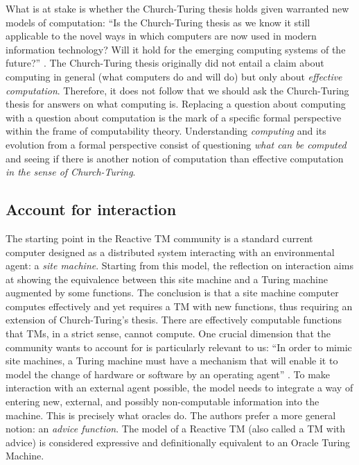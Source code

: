 \documentclass[a4paper, 11pt, twoside]{article}
\begin{document}
What is at stake is whether the Church-Turing thesis holds given warranted new models of computation: ``Is the Church-Turing thesis as we know it still applicable to the novel ways in which computers are now used in modern information technology? Will it hold for the emerging computing systems of the future?'' \parencite{VanLeeuwen2001}. 
The Church-Turing thesis originally did not entail a claim about computing in general (what computers do and will do) but only about \textit{effective computation}. Therefore, it does not follow that we should ask the Church-Turing thesis for answers on what computing is. Replacing a question about computing with a question about computation is the mark of a specific formal perspective within the frame of computability theory. Understanding \textit{computing} and its evolution from a formal perspective consist of questioning \textit{what can be computed} and seeing if there is another notion of computation than effective computation \textit{in the sense of Church-Turing}. 

\subsection{Account for interaction}

The starting point in the Reactive TM community is a standard current computer designed as a distributed system interacting with an environmental agent: a \textit{site machine}. Starting from this model, the reflection on interaction aims at showing the equivalence between this site machine and a Turing machine augmented by some functions. The conclusion is that a site machine computer computes effectively and yet requires a TM with new functions, thus requiring an extension of Church-Turing's thesis. There are effectively computable functions that TMs, in a strict sense, cannot compute. One crucial dimension that the community wants to account for is particularly relevant to us: ``In order to mimic site machines, a Turing machine must have a mechanism that will enable it to model the change of hardware or software by an operating agent'' \parencite{VanLeeuwen2001}. To make interaction with an external agent possible, the model needs to integrate a way of entering new, external, and possibly non-computable information into the machine. This is precisely what oracles do. The authors prefer a more general notion: an \textit{advice function}. The model of a Reactive TM (also called a TM with advice) is considered expressive and definitionally equivalent to an Oracle Turing Machine.	
\end{document}
